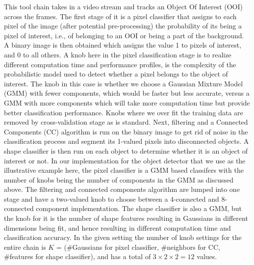 This tool chain takes in a video stream and tracks an Object Of Interest (OOI) across the frames. The first stage of it is a pixel classifier that assigns to each pixel of the image (after potential pre-processing) the probability of its being a pixel of interest, i.e., of belonging to an OOI or being a part of the background. A binary image is then obtained which assigns the value 1 to pixels of interest, and 0 to all others. A knob here in the pixel classification stage is to realize different computation time and performance profiles, is the complexity of the probabilistic model used to detect whether a pixel belongs to the object of interest. The knob in this case is whether we choose a Gaussian Mixture Model (GMM) with fewer components, which would be faster but less accurate, versus a GMM with more components which will take more computation time but provide better classification performance. Knobs where we over fit the training data are removed by cross-validation stage as is standard. Next, filtering and a Connected Components (CC) algorithm is run on the binary image to get rid of noise in the classification process and segment its 1-valued pixels into disconnected objects. A shape classifier is then run on each object to determine whether it is an object of interest or not. 
In our implementation for the object detector that we use as the illustrative example here, the pixel classifier is a GMM based classifers with the number of knobs being the number of components in the GMM as discussed above. The filtering and connected components algorithm are lumped into one stage and have a two-valued knob to choose between a 4-connected and 8-connected component implementation. The shape classifier is also a GMM, but the knob for it is the number of shape features resulting in Gaussians in different dimensions being fit, and hence resulting in different computation time and classification accuracy.
In the given setting the number of knob settings for the entire chain is $K$ = (\#Gaussians for pixel classifier, \#neighbors for CC, \#features for shape classifier), and has a total of $3 \times 2 \times 2 = 12$ values.

